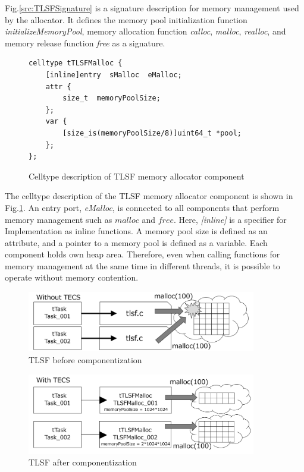 \documentclass[a4j,12pt,oneside,openany,english]{jsbook}
\begin{document}
Fig.\ref{src:TLSFSignature} is a signature description for memory management used by the allocator.
It defines the memory pool initialization function {\it initializeMemoryPool}, memory allocation function {\it calloc}, {\it malloc}, {\it realloc}, and memory release function {\it free} as a signature.

\begin{figure}[t]
\centering
\begin{lstlisting}
celltype tTLSFMalloc {
    [inline]entry  sMalloc  eMalloc;
    attr {
        size_t  memoryPoolSize;
    };
    var {
        [size_is(memoryPoolSize/8)]uint64_t *pool;
    };
};
\end{lstlisting}
\caption{Celltype description of TLSF memory allocator component}  
\label{src:TLSFCelltype}
\end{figure}

The celltype description of the TLSF memory allocator component is shown in Fig.\ref{src:TLSFCelltype}.
An entry port, {\it eMalloc}, is connected to all components that perform memory management such as $malloc$ and $free$.
Here, {\it [inline]} is a specifier for Implementation as inline functions.
A memory pool size is defined as an attribute, and a pointer to a memory pool is defined as a variable.
Each component holds own heap area.
Therefore, even when calling functions for memory management at the same time in different threads, it is possible to operate without memory contention.

\begin{figure}[t]
    \centering
    \includegraphics[width=10cm,clip]{figure/WithoutTECS.pdf}
    \caption{TLSF before componentization}
    \label{fig:WithoutTECS}
\end{figure}

\begin{figure}[t]
    \centering
    \includegraphics[width=10cm,clip]{figure/WithTECS.pdf}
    \caption{TLSF after componentization}
    \label{fig:WithTECS}
\end{figure}
\end{document}

